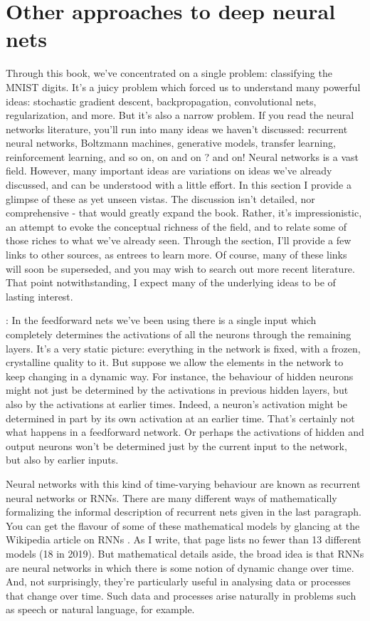 \section{Other approaches to deep neural nets}

Through this book, we've concentrated on a single problem: classifying the MNIST digits. It's a juicy problem which forced us to understand many powerful ideas: stochastic gradient descent, backpropagation, convolutional nets, regularization, and more. But it's also a narrow problem. If you read the neural networks literature, you'll run into many ideas we haven't discussed: recurrent neural networks, Boltzmann machines, generative models, transfer learning, reinforcement learning, and so on, on and on ? and on! Neural networks is a vast field. However, many important ideas are variations on ideas we've already discussed, and can be understood with a little effort. In this section I provide a glimpse of these as yet unseen vistas. The discussion isn't detailed, nor comprehensive - that would greatly expand the book. Rather, it's impressionistic, an attempt to evoke the conceptual richness of the field, and to relate some of those riches to what we've already seen. Through the section, I'll provide a few links to other sources, as entrees to learn more. Of course, many of these links will soon be superseded, and you may wish to search out more recent literature. That point notwithstanding, I expect many of the underlying ideas to be of lasting interest.

: In the feedforward nets we've been using there is a single input which completely determines the activations of all the neurons through the remaining layers. It's a very static picture: everything in the network is fixed, with a frozen, crystalline quality to it. But suppose we allow the elements in the network to keep changing in a dynamic way. For instance, the behaviour of hidden neurons might not just be determined by the activations in previous hidden layers, but also by the activations at earlier times. Indeed, a neuron's activation might be determined in part by its own activation at an earlier time. That's certainly not what happens in a feedforward network. Or perhaps the activations of hidden and output neurons won't be determined just by the current input to the network, but also by earlier inputs.

Neural networks with this kind of time-varying behaviour are known as recurrent neural networks or RNNs. There are many different ways of mathematically formalizing the informal description of recurrent nets given in the last paragraph. You can get the flavour of some of these mathematical models by glancing at the Wikipedia article on RNNs \cite{WikipeadiaRecurrentneuralnetwork2019}. As I write, that page lists no fewer than 13 different models (18 in 2019). But mathematical details aside, the broad idea is that RNNs are neural networks in which there is some notion of dynamic change over time. And, not surprisingly, they're particularly useful in analysing data or processes that change over time. Such data and processes arise naturally in problems such as speech or natural language, for example.


